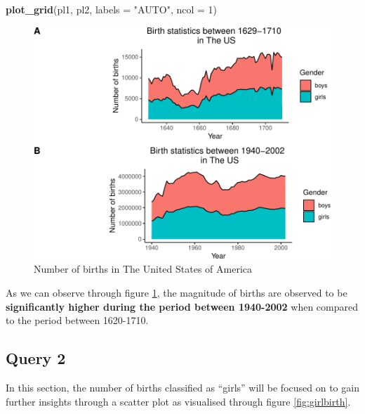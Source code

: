 \documentclass[11pt,a4paper,]{article}
\newenvironment{Shaded}{\begin{snugshade}}{\end{snugshade}}
\newcommand{\AttributeTok}[1]{\textcolor[rgb]{0.13,0.29,0.53}{#1}}
\newcommand{\DecValTok}[1]{\textcolor[rgb]{0.00,0.00,0.81}{#1}}
\newcommand{\FunctionTok}[1]{\textcolor[rgb]{0.13,0.29,0.53}{\textbf{#1}}}
\newcommand{\NormalTok}[1]{#1}
\newcommand{\StringTok}[1]{\textcolor[rgb]{0.31,0.60,0.02}{#1}}
\begin{document}
\begin{Shaded}
\begin{Highlighting}[]
\FunctionTok{plot\_grid}\NormalTok{(pl1, pl2, }\AttributeTok{labels =} \StringTok{"AUTO"}\NormalTok{, }\AttributeTok{ncol =} \DecValTok{1}\NormalTok{)}
\end{Highlighting}
\end{Shaded}

\begin{figure}

{\centering \includegraphics{Arindom_Baruah_32779267_files/figure-latex/figbirth-1} 

}

\caption{Number of births in The United States of America}\label{fig:figbirth}
\end{figure}

\normalsize

As we can observe through figure \ref{fig:figbirth}, the magnitude of births are observed to be \textbf{significantly higher during the period between 1940-2002} when compared to the period between 1620-1710.

\hypertarget{query-2}{%
\subsection{Query 2}\label{query-2}}

In this section, the number of births classified as ``girls'' will be focused on to gain further insights through a scatter plot as visualised through figure \ref{fig:girlbirth}.

\tiny
\end{document}
